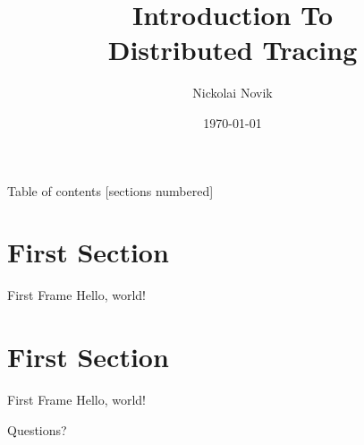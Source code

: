 \documentclass{beamer}
\title{Introduction To \\ Distributed Tracing}
\date{\today}
\author{Nickolai Novik}
\institute{\href{http://github.com/jettify}{http://github.com/jettify}}
\begin{document}
  \maketitle

  \begin{frame}{Table of contents}
    [sections numbered]
    \tableofcontents[hideallsubsections]
  \end{frame}
  \section{First Section}
  \begin{frame}{First Frame}
    Hello, world!
  \end{frame}
  \section{First Section}
  \begin{frame}{First Frame}
    Hello, world!
  \end{frame}
\begin{frame}[standout]
  Questions?
\end{frame}
\end{document}
